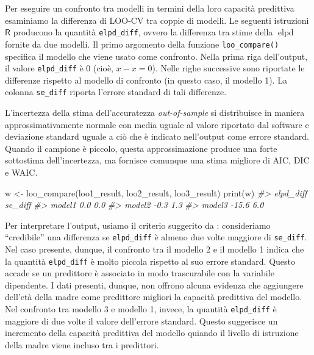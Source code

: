 \documentclass[
  11pt,
]{krantz}
\makeatletter
\newenvironment{Shaded}{\begin{snugshade}}{\end{snugshade}}
\newcommand{\CommentTok}[1]{\textcolor[rgb]{0.37,0.37,0.37}{\textit{#1}}}
\newcommand{\FunctionTok}[1]{\textcolor[rgb]{0,0,0}{#1}}
\newcommand{\NormalTok}[1]{#1}
\newcommand{\OtherTok}[1]{\textcolor[rgb]{0.37,0.37,0.37}{#1}}
\newenvironment{kframe}{%
\medskip{}
\setlength{\fboxsep}{.8em}
 \def\at@end@of@kframe{}%
 \ifinner\ifhmode%
  \def\at@end@of@kframe{\end{minipage}}%
  \begin{minipage}{\columnwidth}%
 \fi\fi%
 \def\FrameCommand##1{\hskip\@totalleftmargin \hskip-\fboxsep
 \colorbox{shadecolor}{##1}\hskip-\fboxsep
     \hskip-\linewidth \hskip-\@totalleftmargin \hskip\columnwidth}%
 \MakeFramed {\advance\hsize-\width
   \@totalleftmargin\z@ \linewidth\hsize
   \@setminipage}}%
 {\par\unskip\endMakeFramed%
 \at@end@of@kframe}
\renewenvironment{Shaded}{\begin{kframe}}{\end{kframe}}
\DeclareMathOperator{\elpd}{elpd} %
\newcommand{\R}{\textsf{R}} %
\theoremstyle{definition}
\theoremstyle{definition}
\theoremstyle{definition}
\theoremstyle{definition}
\theoremstyle{remark}
\makeatother
\begin{document}
Per eseguire un confronto tra modelli in termini della loro capacità predittiva esaminiamo la differenza di LOO-CV tra coppie di modelli. Le seguenti istruzioni \(\R\) producono la quantità \texttt{elpd\_diff}, ovvero la differenza tra stime della \(\elpd\) fornite da due modelli. Il primo argomento della funzione \texttt{loo\_compare()} specifica il modello che viene usato come confronto. Nella prima riga dell'output, il valore \texttt{elpd\_diff} è 0 (cioè, \(x − x = 0\)). Nelle righe successive sono riportate le differenze rispetto al modello di confronto (in questo caso, il modello 1). La colonna \texttt{se\_diff} riporta l'errore standard di tali differenze.

L'incertezza della stima dell'accuratezza \emph{out-of-sample} si distribuisce in maniera approssimativamente normale con media uguale al valore riportato dal software e deviazione standard uguale a ciò che è indicato nell'output come errore standard. Quando il campione è piccolo, questa approssimazione produce una forte sottostima dell'incertezza, ma fornisce comunque una stima migliore di AIC, DIC e WAIC.

\begin{Shaded}
\begin{Highlighting}[]
\NormalTok{w }\OtherTok{\textless{}{-}} \FunctionTok{loo\_compare}\NormalTok{(loo1\_result, loo2\_result, loo3\_result)}
\FunctionTok{print}\NormalTok{(w)}
\CommentTok{\#\textgreater{}        elpd\_diff se\_diff}
\CommentTok{\#\textgreater{} model1   0.0       0.0  }
\CommentTok{\#\textgreater{} model2  {-}0.3       1.3  }
\CommentTok{\#\textgreater{} model3 {-}15.6       6.0}
\end{Highlighting}
\end{Shaded}

Per interpretare l'output, usiamo il criterio suggerito da \citet{gelman1995bayesian}: consideriamo ``credibile'' una differenza se \texttt{elpd\_diff} è almeno due volte maggiore di \texttt{se\_diff}. Nel caso presente, dunque, il confronto tra il modello 2 e il modello 1 indica che la quantità \texttt{elpd\_diff} è molto piccola rispetto al suo errore standard. Questo accade se un predittore è associato in modo trascurabile con la variabile dipendente. I dati presenti, dunque, non offrono alcuna evidenza che aggiungere dell'età della madre come predittore migliori la capacità predittiva del modello. Nel confronto tra modello 3 e modello 1, invece, la quantità \texttt{elpd\_diff} è maggiore di due volte il valore dell'errore standard. Questo suggerisce un incremento della capacità predittiva del modello quiando il livello di istruzione della madre viene incluso tra i predittori.
\end{document}
